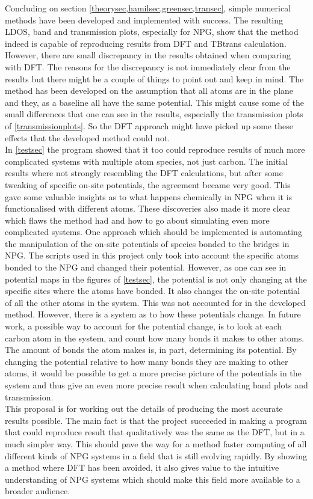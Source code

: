 Concluding on section \cref{theorysec,hamilsec,greensec,transec}, simple numerical methods have been developed and implemented with success. The resulting LDOS, band and transmission plots, especially for NPG, show that the method indeed is capable of reproducing results from DFT and TBtrans calculation. However, there are small discrepancy in the results obtained when comparing with DFT. The reasons for the discrepancy is not immediately clear from the results but there might be a couple of things to point out and keep in mind. The method has been developed on the assumption that all atoms are in the plane and they, as a baseline all have the same potential. This might cause some of the small differences that one can see in the results, especially the transmission plots of \cref{transmissionplots}. So the DFT approach might have picked up some these effects that the developed method could not.\\
In \cref{testsec} the program showed that it too could reproduce results of much more complicated systems with multiple atom species, not just carbon. The initial results where not strongly resembling the DFT calculations, but after some tweaking of specific on-site potentials, the agreement became very good. This gave some valuable insights as to what happens chemically in NPG when it is functionalised with different atoms. These discoveries also made it more clear which flaws the method had and how to go about simulating even more complicated systems. One approach which should be implemented is automating the manipulation of the on-site potentials of species bonded to the bridges in NPG. The scripts used in this project only took into account the specific atoms bonded to the NPG and changed their potential. However, as one can see in potential maps in the figures of \cref{testsec}, the potential is not only changing at the specific sites where the atoms have bonded. It also changes the on-site potential of all the other atoms in the system. This was not accounted for in the developed method. However, there is a system as to how these potentials change. In future work, a possible way to account for the potential change, is to look at each carbon atom in the system, and count how many bonds it makes to other atoms. The amount of bonds the atom makes is, in part, determining its potential. By changing the potential relative to how many bonds they are making to other atoms, it would be possible to get a more precise picture of the potentials in the system and thus give an even more precise result when calculating band plots and transmission. \\
This proposal is for working out the details of producing the most accurate results possible. The main fact is that the project succeeded in making a program that could reproduce result that qualitatively was the same as the DFT, but in a much simpler way. This should pave the way for a method faster computing of all different kinds of NPG systems in a field that is still evolving rapidly. By showing a method where DFT has been avoided, it also gives value to the intuitive understanding of NPG systems which should make this field more available to a broader audience.  